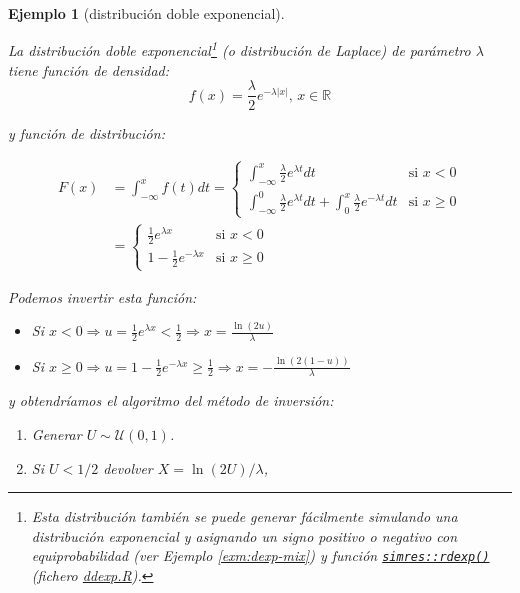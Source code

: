 \documentclass[
  10pt,
]{book}
\theoremstyle{break}
\newtheorem{example}{Ejemplo}[chapter]
\theoremstyle{nonumberplain}
\let\oldfootnote\footnote
\renewcommand\footnote[1]{\oldfootnote{\hspace{2mm}#1}}
\begin{document}
\begin{example}[distribución doble exponencial]
\protect\hypertarget{exm:ddexp}{}\label{exm:ddexp}

La distribución doble exponencial\footnote{Esta distribución también se puede generar fácilmente simulando una distribución exponencial y asignando un signo positivo o negativo con equiprobabilidad (ver Ejemplo \ref{exm:dexp-mix}) y función \href{https://rubenfcasal.github.io/simres/reference/ddexp.html}{\texttt{simres::rdexp()}} (fichero \href{R/ddexp.R}{\emph{ddexp.R}}).} (o distribución de Laplace) de parámetro \(\lambda\) tiene función de densidad:
\[f(x) = \frac{\lambda}{2} e^{-\lambda |x|} \text{, } x \in \mathbb{R}\]

y función de distribución:

\[
\begin{aligned}
F(x) & =\int_{-\infty}^{x}f(t) dt
= \left\{
\begin{array}{ll}
\int_{-\infty}^{x} \frac{\lambda}{2}e^{\lambda t} dt & \text{si } x<0 \\
\int_{-\infty}^{0} \frac{\lambda}{2}e^{\lambda t} dt + 
\int_{0}^{x} \frac{\lambda}{2}e^{-\lambda t} dt & \text{si } x\geq0
\end{array}
\right. \\
&= \left\{
\begin{array}{ll}
\frac{1}{2}e^{\lambda x} & \text{si } x<0 \\
1-\frac{1}{2}e^{-\lambda x} & \text{si } x\geq0
\end{array}
\right.
\end{aligned}
\]

Podemos invertir esta función:

\begin{itemize}
\item
  Si \(x < 0 \Rightarrow u = \frac{1}{2}e^{\lambda x} < \frac{1}{2} \Rightarrow x = \frac{\ln \left( 2u\right) }{ \lambda }\)
\item
  Si \(x \geq 0 \Rightarrow u = 1-\frac{1}{2}e^{-\lambda x} \geq \frac{1}{2} \Rightarrow x =-\frac{\ln \left( 2(1-u)\right) }{ \lambda }\)
\end{itemize}

y obtendríamos el algoritmo del método de inversión:

\begin{enumerate}
\def\labelenumi{\arabic{enumi}.}
\item
  Generar \(U \sim \mathcal{U}(0, 1)\).
\item
  Si \(U < 1/2\) devolver \(X = \ln \left( 2U \right)/\lambda\),


\end{enumerate}
\end{example}
\end{document}
